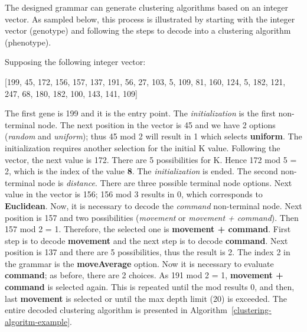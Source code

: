 \documentclass[conference,compsoc]{IEEEtran}
\begin{document}
The designed grammar can generate clustering algorithms based on an integer vector. As sampled below, this process is illustrated by starting with the integer vector (genotype) and following the steps to decode into a clustering algorithm (phenotype). 


Supposing the following integer vector:


[199, 45, 172, 156, 157, 137, 191, 56, 27, 103, 5, 109, 81, 160, 124, 5, 182, 121, 247, 68, 180, 182, 100, 143, 141, 109]


The first gene is 199 and it is the entry point. The \textit{initialization} is the first non-terminal node. The next position in the vector is 45 and we have 2 options (\textit{random} and \textit{uniform}); thus 45 mod 2 will result in 1 which selects \textbf{uniform}. The initialization requires another selection for the initial K value. Following the vector, the next value is 172. There are 5 possibilities for K. Hence 172 mod 5 = 2, which is the index of the value \textbf{8}. The \textit{initialization} is ended. The second non-terminal node is \textit{distance}. There are three possible terminal node options. Next value in the vector is 156; 156 mod 3 results in 0, which corresponds to \textbf{Euclidean}. Now, it is necessary to decode the \textit{command} non-terminal node. Next position is 157 and two possibilities (\textit{movement} or \textit{movement + command}). Then 157 mod 2 = 1. Therefore, the selected one is \textbf{movement + command}. First step is to decode \textbf{movement} and the next step  is to  decode  \textbf{command}. Next position is 137 and there are 5 possibilities, thus the result is 2. The index 2 in the grammar is the \textbf{moveAverage} option. Now it is necessary to evaluate \textbf{command}; as before, there are 2 choices. As 191 mod 2 = 1, \textbf{movement + command} is selected again. This is repeated until the mod results 0,  and then, last \textbf{movement} is selected or until the max depth limit (20) is exceeded. The entire decoded clustering algorithm is presented in Algorithm~\ref{clustering-algoritm-example}.
\end{document}
